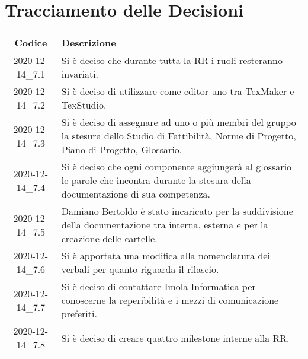 \section*{Tracciamento delle Decisioni}

\begin{center}
	\begin{longtable}{|c|p{14.5cm}|}
	\hline
	\rowcolor{lighter-grayer}
	\textbf{Codice} & \textbf{Descrizione} \\
	\hline
	\endfirsthead

	
	2020-12-14\_7.1 & Si è deciso che durante tutta la RR i ruoli resteranno invariati. \\
	\hline
	2020-12-14\_7.2 & Si è deciso di utilizzare come editor \glock{\LaTeX} uno tra TexMaker e TexStudio. \\
	\hline
	2020-12-14\_7.3 & Si è deciso di assegnare ad uno o più membri del gruppo la stesura dello Studio di Fattibilità, Norme di Progetto, Piano di Progetto, Glossario.  \\
	\hline
	2020-12-14\_7.4 & Si è deciso che ogni componente aggiungerà al glossario le parole che incontra durante la stesura della documentazione di sua competenza.  \\
	\hline
	2020-12-14\_7.5 & Damiano Bertoldo è stato incaricato per la suddivisione della documentazione tra interna, esterna e per la creazione delle cartelle.  \\
	\hline
	2020-12-14\_7.6 & Si è apportata una modifica alla nomenclatura dei verbali per quanto riguarda il rilascio. \\
	\hline
	2020-12-14\_7.7 & Si è deciso di contattare Imola Informatica per conoscerne la reperibilità e i mezzi di comunicazione preferiti.  \\
	\hline
	2020-12-14\_7.8 & Si è deciso di creare quattro milestone interne alla RR.  \\
	\hline
	

	\end{longtable}
\end{center}